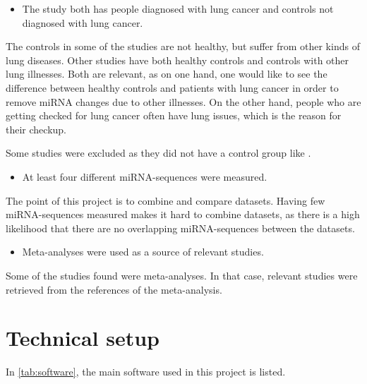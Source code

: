 \begin{itemize}
    \item The study both has people diagnosed with lung cancer and controls not diagnosed with lung cancer.
\end{itemize}

The controls in some of the studies are not healthy, but suffer from other kinds of lung diseases. Other studies have both healthy controls and controls with other lung illnesses. Both are relevant, as on one hand, one would like to see the difference between healthy controls and patients with lung cancer in order to remove miRNA changes due to other illnesses. On the other hand, people who are getting checked for lung cancer often have lung issues, which is the reason for their checkup.

Some studies were excluded as they did not have a control group like \citet{Mitchell2017}.

\begin{itemize}
    \item At least four different miRNA-sequences were measured.
\end{itemize}

The point of this project is to combine and compare datasets. Having few miRNA-sequences measured makes it hard to combine datasets, as there is a high likelihood that there are no overlapping miRNA-sequences between the datasets.

\begin{itemize}
    \item Meta-analyses were used as a source of relevant studies.
\end{itemize}

Some of the studies found were meta-analyses. In that case, relevant studies were retrieved from the references of the meta-analysis.

\section{Technical setup}
In \autoref{tab:software}, the main software used in this project is listed.

